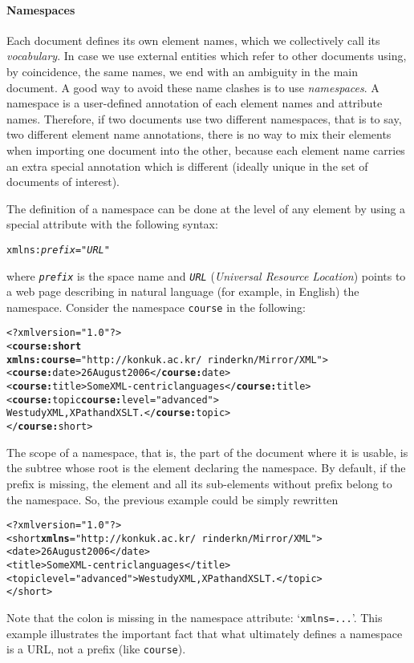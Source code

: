 \paragraph{Namespaces}

Each \XML document defines its own element names, which we
collectively call its \emph{vocabulary}. In case we use external
entities which refer to other \XML documents using, by coincidence,
the same names, we end with an ambiguity in the main document. A good
way to avoid these name clashes is to use \emph{namespaces}. A
namespace is a user\hyp{}defined annotation of each element names and
attribute names. Therefore, if two \XML documents use two different
namespaces, that is to say, two different element name annotations,
there is no way to mix their elements when importing one document into
the other, because each element name carries an extra special
annotation which is different (ideally unique in the set of documents
of interest).

The definition of a namespace can be done at the level of any element
by using a special attribute with the following syntax:
\begin{alltt}
xmlns:\textit{prefix} = "\textit{URL}"
\end{alltt}
where \texttt{\emph{prefix}} is the space name and \texttt{\emph{URL}}
(\emph{Universal Resource Location}) points to a web page describing
in natural language (for example, in English) the namespace. Consider
the namespace \texttt{course} in the following:
\begin{alltt}
<?xml version="1.0"?>
<\textbf{course:short}
  \textbf{xmlns:course}="http://konkuk.ac.kr/~rinderkn/Mirror/XML">
 <\textbf{course:}date>26 August 2006</\textbf{course:}date>
 <\textbf{course:}title>Some XML-centric languages</\textbf{course:}title>
 <\textbf{course:}topic \textbf{course:}level="advanced">
   We study XML, XPath and XSLT.</\textbf{course:}topic>
</\textbf{course:}short>
\end{alltt}
The scope of a namespace, that is, the part of the document where it
is usable, is the subtree whose root is the element declaring the
namespace. By default, if the prefix is missing, the element and all
its sub\hyp{}elements without prefix belong to the namespace. So, the
previous example could be simply rewritten
\begin{alltt}
<?xml version="1.0"?>
<short \textbf{xmlns}="http://konkuk.ac.kr/~rinderkn/Mirror/XML">
 <date>26 August 2006</date>
 <title>Some XML-centric languages</title>
 <topic level="advanced">We study XML, XPath and XSLT.</topic>
</short>
\end{alltt}
Note that the colon is missing in the namespace attribute:
`\texttt{xmlns=...}'. This example illustrates the important fact that
what ultimately defines a namespace is a URL, not a prefix (like
\texttt{course}).

